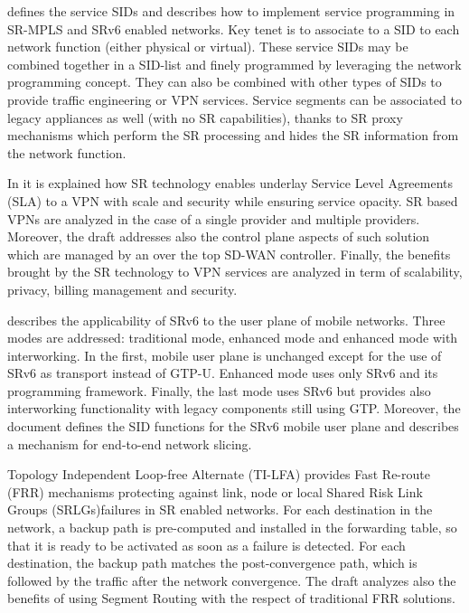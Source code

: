 \cite{id-sr-service-programming} defines the service SIDs and describes how to implement service programming in SR-MPLS and SRv6 enabled networks. Key tenet is to associate to a SID to each network function (either physical or virtual). These service SIDs may be combined together in a SID-list and finely programmed by leveraging the network programming concept. They can also be combined with other types of SIDs to provide traffic engineering or VPN services. Service segments can be associated to legacy appliances as well (with no SR capabilities), thanks to SR proxy mechanisms which perform the SR processing and hides the SR information from the network function.

In \cite{id-sr-for-sdwan} it is explained how SR technology enables underlay Service Level Agreements (SLA) to a VPN with scale and security while ensuring service opacity. SR based VPNs are analyzed in the case of a single provider and multiple providers. Moreover, the draft addresses also the control plane aspects of such solution which are managed by an over the top SD-WAN controller. Finally, the benefits brought by the SR technology to VPN services are analyzed in term of scalability, privacy, billing management and security.

\cite{id-srv6-mobile-uplane} describes the applicability of SRv6 to the user plane of mobile networks. Three modes are addressed: traditional mode, enhanced mode and enhanced mode with interworking. In the first, mobile user plane is unchanged except for the use of SRv6 as transport instead of GTP-U. Enhanced mode uses only SRv6 and its programming framework. Finally, the last mode uses SRv6 but provides also interworking functionality with legacy components still using GTP. Moreover, the document defines the SID functions for the SRv6 mobile user plane and describes a mechanism for end-to-end network slicing.

Topology Independent Loop-free Alternate (TI-LFA) \cite{id-segment-routing-ti-lfa} provides Fast Re-route (FRR) mechanisms protecting against link, node or local Shared Risk Link Groups (SRLGs)failures in SR enabled networks. For each destination in the network, a backup path is pre-computed and installed in the forwarding table, so that it is ready to be activated as soon as a failure is detected. For each destination, the backup path matches the post-convergence path, which is followed by the traffic after the network convergence. The draft analyzes also the benefits of using Segment Routing with the respect of traditional FRR solutions.

